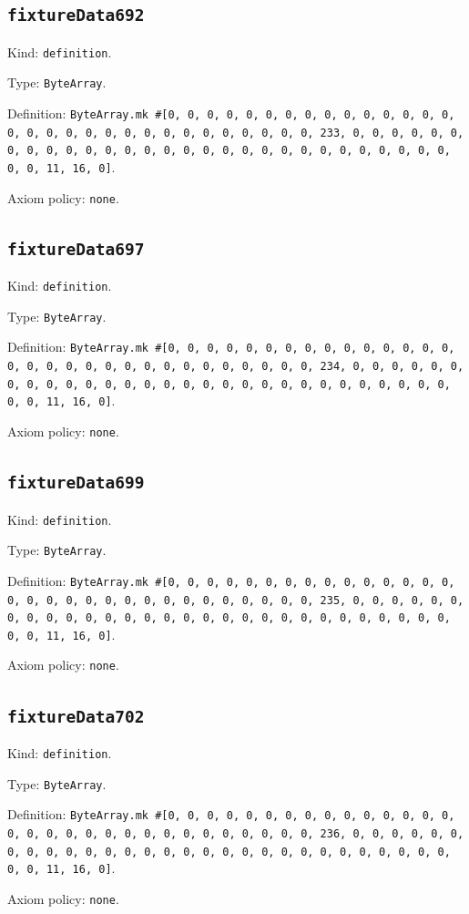 \documentclass[11pt]{article}
\begin{document}
\subsection*{\texttt{fixtureData692}}
\noindent Kind: \texttt{definition}.\par
\noindent Type: \texttt{ByteArray}.\par
\noindent Definition: \texttt{ByteArray.mk \#[0, 0, 0, 0, 0, 0, 0, 0, 0, 0, 0, 0, 0, 0, 0, 0, 0, 0, 0, 0, 0, 0, 0, 0, 0, 0, 0, 0, 0, 0, 0, 233, 0, 0, 0, 0, 0, 0, 0, 0, 0, 0, 0, 0, 0, 0, 0, 0, 0, 0, 0, 0, 0, 0, 0, 0, 0, 0, 0, 0, 0, 0, 0, 11, 16, 0]}.\par
\noindent Axiom policy: \texttt{none}.\par
\subsection*{\texttt{fixtureData697}}
\noindent Kind: \texttt{definition}.\par
\noindent Type: \texttt{ByteArray}.\par
\noindent Definition: \texttt{ByteArray.mk \#[0, 0, 0, 0, 0, 0, 0, 0, 0, 0, 0, 0, 0, 0, 0, 0, 0, 0, 0, 0, 0, 0, 0, 0, 0, 0, 0, 0, 0, 0, 0, 234, 0, 0, 0, 0, 0, 0, 0, 0, 0, 0, 0, 0, 0, 0, 0, 0, 0, 0, 0, 0, 0, 0, 0, 0, 0, 0, 0, 0, 0, 0, 0, 11, 16, 0]}.\par
\noindent Axiom policy: \texttt{none}.\par
\subsection*{\texttt{fixtureData699}}
\noindent Kind: \texttt{definition}.\par
\noindent Type: \texttt{ByteArray}.\par
\noindent Definition: \texttt{ByteArray.mk \#[0, 0, 0, 0, 0, 0, 0, 0, 0, 0, 0, 0, 0, 0, 0, 0, 0, 0, 0, 0, 0, 0, 0, 0, 0, 0, 0, 0, 0, 0, 0, 235, 0, 0, 0, 0, 0, 0, 0, 0, 0, 0, 0, 0, 0, 0, 0, 0, 0, 0, 0, 0, 0, 0, 0, 0, 0, 0, 0, 0, 0, 0, 0, 11, 16, 0]}.\par
\noindent Axiom policy: \texttt{none}.\par
\subsection*{\texttt{fixtureData702}}
\noindent Kind: \texttt{definition}.\par
\noindent Type: \texttt{ByteArray}.\par
\noindent Definition: \texttt{ByteArray.mk \#[0, 0, 0, 0, 0, 0, 0, 0, 0, 0, 0, 0, 0, 0, 0, 0, 0, 0, 0, 0, 0, 0, 0, 0, 0, 0, 0, 0, 0, 0, 0, 236, 0, 0, 0, 0, 0, 0, 0, 0, 0, 0, 0, 0, 0, 0, 0, 0, 0, 0, 0, 0, 0, 0, 0, 0, 0, 0, 0, 0, 0, 0, 0, 11, 16, 0]}.\par
\noindent Axiom policy: \texttt{none}.\par
\end{document}
